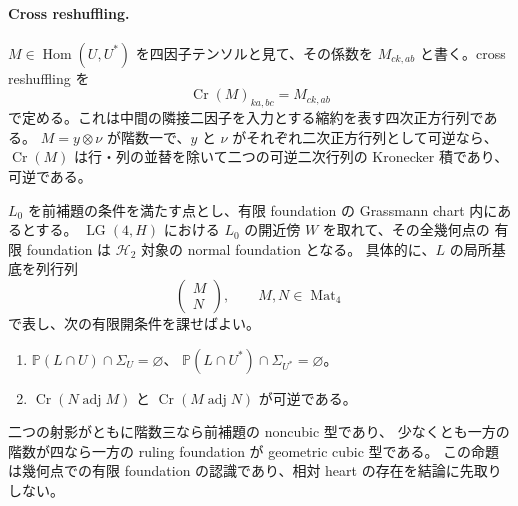 \paragraph{Cross reshuffling.}
$M\in\operatorname{Hom}(U,U^*)$ を四因子テンソルと見て、その係数を
$M_{ck,ab}$ と書く。cross reshuffling を
\[
 \operatorname{Cr}(M)_{ka,bc}=M_{ck,ab}
\]
で定める。これは中間の隣接二因子を入力とする縮約を表す四次正方行列である。
$M=y\otimes\nu$ が階数一で、$y$ と $\nu$ がそれぞれ二次正方行列として可逆なら、
$\operatorname{Cr}(M)$ は行・列の並替を除いて二つの可逆二次行列の Kronecker 積であり、可逆である。

\begin{proposition}
\label{prop:lagrangian-geometric-recognition-open}
$L_0$ を前補題の条件を満たす点とし、有限 foundation の Grassmann chart 内にあるとする。
$\operatorname{LG}(4,H)$ における $L_0$ の開近傍 $W$ を取れて、その全幾何点の
有限 foundation は $\mathcal H_2$ 対象の normal foundation となる。
具体的に、$L$ の局所基底を列行列
\[
 \begin{pmatrix}M\\N\end{pmatrix},\qquad M,N\in\operatorname{Mat}_4
\]
で表し、次の有限開条件を課せばよい。
\begin{enumerate}
\item $\mathbb P(L\cap U)\cap\Sigma_U=\varnothing$、
      $\mathbb P(L\cap U^*)\cap\Sigma_{U^*}=\varnothing$。
\item $\operatorname{Cr}(N\operatorname{adj}M)$ と
      $\operatorname{Cr}(M\operatorname{adj}N)$ が可逆である。
\end{enumerate}
二つの射影がともに階数三なら前補題の noncubic 型であり、
少なくとも一方の階数が四なら一方の ruling foundation が geometric cubic 型である。
この命題は幾何点での有限 foundation の認識であり、相対 heart の存在を結論に先取りしない。
\end{proposition}
